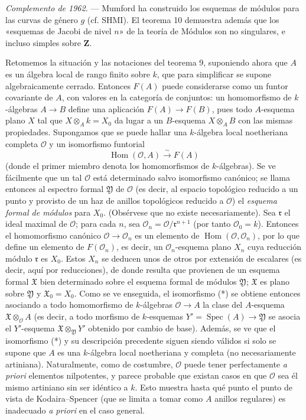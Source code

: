 \emph{Complemento de 1962.} --- Mumford ha construido los esquemas de módulos
para las curvas de género $g$ (cf. SHMI). El teorema 10 demuestra además que
los «esquemas de Jacobi de nivel $n$» de la teoría de Módulos son no singulares,
e incluso simples sobre $\mathbf Z$.

Retomemos la situación y las notaciones del teorema 9, suponiendo ahora que $A$
es un álgebra local de rango finito sobre $k$, que para simplificar se supone
algebraicamente cerrado. Entonces $F(A)$ puede considerarse como un funtor
covariante de $A$, con valores en la categoría de conjuntos: un homomorfismo de
$k$-álgebras $A\longrightarrow B$ define una aplicación
$F(A)\longrightarrow F(B)$, pues todo $A$-esquema plano $X$ tal que
$X\otimes_A k=X_0$ da lugar a un $B$-esquema $X\otimes_A B$ con las mismas
propiedades. Supongamos que se puede hallar una $k$-álgebra local noetheriana
completa $\mathcal O$ y un isomorfismo funtorial
\begin{equation}
  \tag{*}
  \operatorname{Hom}(\mathcal O,A)\xrightarrow{\sim}F(A)
\end{equation}
(donde el primer miembro denota los homomorfismos de $k$-álgebras). Se ve
fácilmente que un tal $\mathcal O$ está determinado salvo isomorfismo canónico;
se llama entonces al espectro formal $\mathfrak Y$ de $\mathcal O$ (es decir,
al espacio topológico reducido a un punto y provisto de un haz de anillos
topológicos reducido a $\mathcal O$) el \emph{esquema formal de módulos} para
$X_0$. (Obsérvese que no existe necesariamente). Sea $\mathfrak r$ el ideal
maximal de $\mathcal O$; para cada $n$, sea
$\mathcal O_n=\mathcal O/\mathfrak r^{n+1}$ (por tanto $\mathcal O_0=k$).
Entonces el homomorfismo canónico $\mathcal O\longrightarrow\mathcal O_n$ es un
elemento de $\operatorname{Hom}(\mathcal O,\mathcal O_n)$, por lo que define un
elemento de $F(\mathcal O_n)$, es decir, un $\mathcal O_n$-esquema plano $X_n$
cuya reducción módulo $\mathfrak r$ es $X_0$. Estos $X_n$ se deducen unos de
otros por extensión de escalares (es decir, aquí por reducciones), de donde
resulta que provienen de un esquema formal $\mathfrak X$ bien determinado sobre
el esquema formal de módulos $\mathfrak Y$; $\mathfrak X$ es plano sobre
$\mathfrak Y$ y $\mathfrak X_0=X_0$. Como se ve enseguida, el isomorfismo (*)
se obtiene entonces asociando a todo homomorfismo de $k$-álgebras
$\mathcal O\longrightarrow A$ la clase del $A$-esquema
$\mathfrak X\otimes_{\mathcal O}A$ (es decir, a todo morfismo de $k$-esquemas
$Y'=\operatorname{Spec}(A)\longrightarrow\mathfrak Y$ se asocia el
$Y'$-esquema $\mathfrak X\otimes_{\mathfrak Y}Y'$ obtenido por cambio de base).
Además, se ve que el isomorfismo (*) y su descripción precedente siguen siendo
válidos si solo se supone que $A$ es una $k$-álgebra local noetheriana y
completa (no necesariamente artiniana). Naturalmente, como de costumbre,
$\mathcal O$ puede tener perfectamente \textit{a priori} elementos nilpotentes,
y parece probable que existan casos en que $\mathcal O$ sea él mismo artiniano
sin ser idéntico a $k$. Esto muestra hasta qué punto el punto de vista de
Kodaira--Spencer (que se limita a tomar como $A$ anillos regulares) es
inadecuado \textit{a priori} en el caso general.

